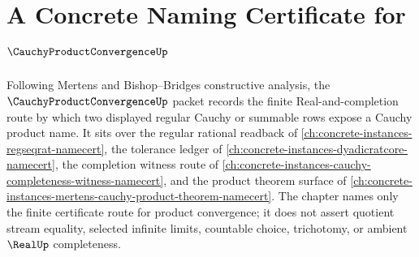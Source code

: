 \chapter{A Concrete Naming Certificate for $\CauchyProductConvergenceUp$}
\label{ch:concrete-instances-cauchy-product-convergence-namecert}

Following Mertens and Bishop--Bridges constructive analysis, the $\CauchyProductConvergenceUp$ packet records the finite Real-and-completion route by which two displayed regular Cauchy or summable rows expose a Cauchy product name. It sits over the regular rational readback of \autoref{ch:concrete-instances-regseqrat-namecert}, the tolerance ledger of \autoref{ch:concrete-instances-dyadicratcore-namecert}, the completion witness route of \autoref{ch:concrete-instances-cauchy-completeness-witness-namecert}, and the product theorem surface of \autoref{ch:concrete-instances-mertens-cauchy-product-theorem-namecert}. The chapter names only the finite certificate route for product convergence; it does not assert quotient stream equality, selected infinite limits, countable choice, trichotomy, or ambient $\RealUp$ completeness.

